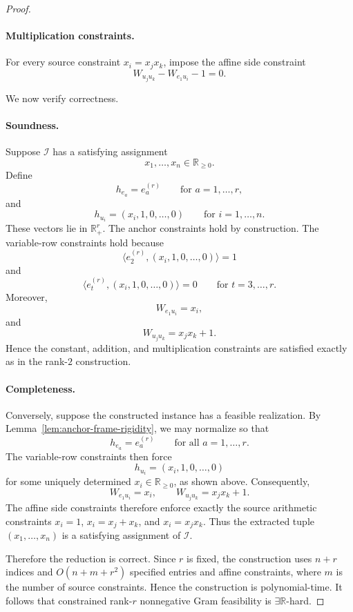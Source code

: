 \documentclass[11pt]{article}
\begin{document}
\begin{proof}
\paragraph{Multiplication constraints.}
For every source constraint \(x_i=x_jx_k\), impose the affine side constraint
\[
W_{u_j u_k}-W_{e_1 u_i}-1=0.
\]

We now verify correctness.

\paragraph{Soundness.}
Suppose \(\mathcal{I}\) has a satisfying assignment
\[
x_1,\dots,x_n\in\mathbb{R}_{\ge 0}.
\]
Define
\[
h_{e_a}=e_a^{(r)}
\qquad \text{for } a=1,\dots,r,
\]
and
\[
h_{u_i}=(x_i,1,0,\dots,0)
\qquad \text{for } i=1,\dots,n.
\]
These vectors lie in \(\mathbb{R}_+^r\). The anchor constraints hold by
construction. The variable-row constraints hold because
\[
\langle e_2^{(r)},(x_i,1,0,\dots,0)\rangle = 1
\]
and
\[
\langle e_t^{(r)},(x_i,1,0,\dots,0)\rangle = 0
\qquad \text{for } t=3,\dots,r.
\]
Moreover,
\[
W_{e_1 u_i}=x_i,
\]
and
\[
W_{u_j u_k}=x_jx_k+1.
\]
Hence the constant, addition, and multiplication constraints are satisfied
exactly as in the rank-$2$ construction.

\paragraph{Completeness.}
Conversely, suppose the constructed instance has a feasible realization.
By Lemma~\ref{lem:anchor-frame-rigidity}, we may normalize so that
\[
h_{e_a}=e_a^{(r)}
\qquad \text{for all } a=1,\dots,r.
\]
The variable-row constraints then force
\[
h_{u_i}=(x_i,1,0,\dots,0)
\]
for some uniquely determined \(x_i\in\mathbb{R}_{\ge 0}\), as shown above.
Consequently,
\[
W_{e_1 u_i}=x_i,
\qquad
W_{u_j u_k}=x_jx_k+1.
\]
The affine side constraints therefore enforce exactly the source arithmetic
constraints \(x_i=1\), \(x_i=x_j+x_k\), and \(x_i=x_jx_k\). Thus the extracted
tuple \((x_1,\dots,x_n)\) is a satisfying assignment of \(\mathcal{I}\).

Therefore the reduction is correct. Since \(r\) is fixed, the construction
uses \(n+r\) indices and \(O(n+m+r^2)\) specified entries and affine
constraints, where \(m\) is the number of source constraints. Hence the
construction is polynomial-time. It follows that constrained rank-$r$
nonnegative Gram feasibility is \(\exists\mathbb{R}\)-hard.
\end{proof}
\end{document}
